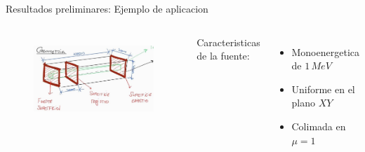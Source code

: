 \documentclass[aspectratio=169,english]{beamer}
\begin{document}
\begin{frame}{Resultados preliminares: Ejemplo de aplicacion}
    

    \begin{columns}
        \begin{figure}
            \centering
            \includegraphics[width=\linewidth]{imagens/croquis1.jpeg}
            \label{fig:croquis1}
        \end{figure}
        
        Caracteristicas de la fuente:
        \begin{itemize}
            \item Monoenergetica de $1 \, MeV$
            \item Uniforme en el plano $XY$
            \item Colimada en $\mu = 1$ 
        \end{itemize}
    \end{columns}

\end{frame}
\end{document}
